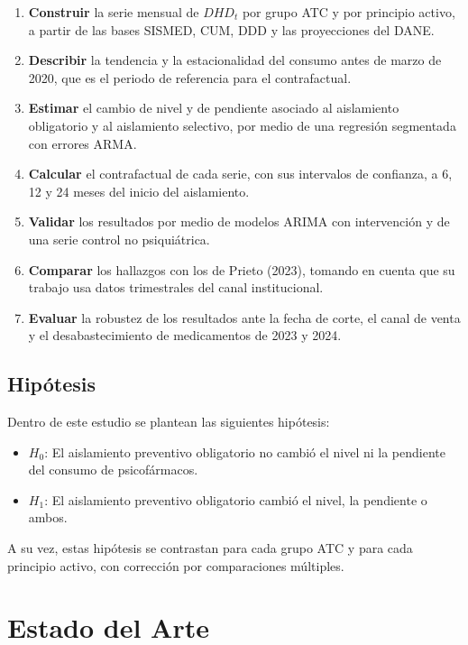 \documentclass[10pt,twoside,xcolor=table,x11anmes]{IEEEtran}
\begin{document}
\begin{enumerate}
    \item \textbf{Construir} la serie mensual de $DHD_t$ por grupo ATC y por principio activo, a partir de las bases SISMED, CUM, DDD y las proyecciones del DANE.
    \item \textbf{Describir} la tendencia y la estacionalidad del consumo antes de marzo de 2020, que es el periodo de referencia para el contrafactual.
    \item \textbf{Estimar} el cambio de nivel y de pendiente asociado al aislamiento obligatorio y al aislamiento selectivo, por medio de una regresión segmentada con errores ARMA.
    \item \textbf{Calcular} el contrafactual de cada serie, con sus intervalos de confianza, a 6, 12 y 24 meses del inicio del aislamiento.
    \item \textbf{Validar} los resultados por medio de modelos ARIMA con intervención y de una serie control no psiquiátrica.
    \item \textbf{Comparar} los hallazgos con los de Prieto (2023), tomando en cuenta que su trabajo usa datos trimestrales del canal institucional.
    \item \textbf{Evaluar} la robustez de los resultados ante la fecha de corte, el canal de venta y el desabastecimiento de medicamentos de 2023 y 2024.
\end{enumerate}

\subsection{Hipótesis}

Dentro de este estudio se plantean las siguientes hipótesis:

\begin{itemize}
    \item $H_0$: El aislamiento preventivo obligatorio no cambió el nivel ni la pendiente del consumo de psicofármacos.
    \item $H_1$: El aislamiento preventivo obligatorio cambió el nivel, la pendiente o ambos.
\end{itemize}

A su vez, estas hipótesis se contrastan para cada grupo ATC y para cada principio activo, con corrección por comparaciones múltiples.

\section{Estado del Arte}
\end{document}
